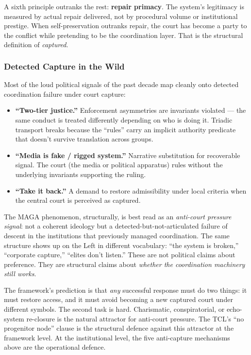 \documentclass[
]{article}
\providecommand{\tightlist}{%
  \setlength{\itemsep}{0pt}\setlength{\parskip}{0pt}}
\begin{document}
A sixth principle outranks the rest: \textbf{repair primacy}. The
system's legitimacy is measured by actual repair delivered, not by
procedural volume or institutional prestige. When self-preservation
outranks repair, the court has become a party to the conflict while
pretending to be the coordination layer. That is the structural
definition of \emph{captured}.

\subsubsection{Detected Capture in the
Wild}\label{detected-capture-in-the-wild}

Most of the loud political signals of the past decade map cleanly
onto detected coordination failure under court capture:

\begin{itemize}
\tightlist
\item
  \textbf{``Two-tier justice.''} Enforcement asymmetries are
  invariants violated --- the same conduct is treated differently
  depending on who is doing it. Triadic transport breaks because the
  ``rules'' carry an implicit authority predicate that doesn't
  survive translation across groups.
\item
  \textbf{``Media is fake / rigged system.''} Narrative substitution
  for recoverable signal. The court (the media or political
  apparatus) rules without the underlying invariants supporting the
  ruling.
\item
  \textbf{``Take it back.''} A demand to restore admissibility under
  local criteria when the central court is perceived as captured.
\end{itemize}

The MAGA phenomenon, structurally, is best read as an
\emph{anti-court pressure signal}: not a coherent ideology but a
detected-but-not-articulated failure of descent in the institutions
that previously managed coordination. The same structure shows up on
the Left in different vocabulary: ``the system is broken,''
``corporate capture,'' ``elites don't listen.'' These are not
political claims about preference. They are structural claims about
\emph{whether the coordination machinery still works}.

The framework's prediction is that \emph{any} successful response
must do two things: it must restore access, and it must avoid
becoming a new captured court under different symbols. The second
task is hard. Charismatic, conspiratorial, or echo-system re-closure
is the natural attractor for anti-court pressure. The TCL's
``no progenitor node'' clause is the structural defence against this
attractor at the framework level. At the institutional level, the
five anti-capture mechanisms above are the operational defence.
\end{document}
